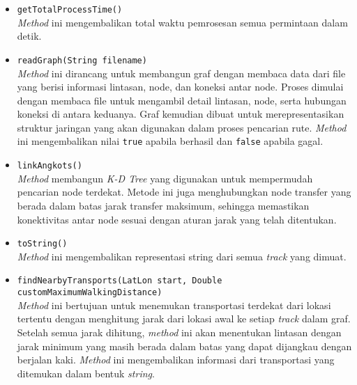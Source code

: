 \begin{itemize}
\begin{itemize}
        \item \texttt{getTotalProcessTime()}
        \\ \textit{Method} ini mengembalikan total waktu pemrosesan semua permintaan dalam detik.
        \item \texttt{readGraph(String filename)}
        \\ \textit{Method} ini dirancang untuk membangun graf dengan membaca data dari file yang berisi informasi lintasan, node, dan koneksi antar node. Proses dimulai dengan membaca file untuk mengambil detail lintasan, node, serta hubungan koneksi di antara keduanya. Graf kemudian dibuat untuk merepresentasikan struktur jaringan yang akan digunakan dalam proses pencarian rute. \textit{Method} ini mengembalikan nilai \texttt{true} apabila berhasil dan \texttt{false} apabila gagal.
        \newpage
        \item \texttt{linkAngkots()}
        \\ \textit{Method} membangun \textit{K-D Tree} yang digunakan untuk mempermudah pencarian node terdekat. Metode ini juga menghubungkan node transfer yang berada dalam batas jarak transfer maksimum, sehingga memastikan konektivitas antar node sesuai dengan aturan jarak yang telah ditentukan.
        \item \texttt{toString()}
        \\ \textit{Method} ini mengembalikan representasi string dari semua \textit{track} yang dimuat.
        \item \texttt{findNearbyTransports(LatLon start, Double customMaximumWalkingDistance)}
        \\ \textit{Method} ini bertujuan untuk menemukan transportasi terdekat dari lokasi tertentu dengan menghitung jarak dari lokasi awal ke setiap \textit{track} dalam graf. Setelah semua jarak dihitung, \textit{method} ini akan menentukan lintasan dengan jarak minimum yang masih berada dalam batas yang dapat dijangkau dengan berjalan kaki. \textit{Method} ini mengembalikan informasi dari transportasi yang ditemukan dalam bentuk \textit{string}.
    \end{itemize}
\end{itemize}

